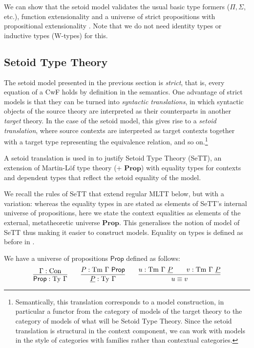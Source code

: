 \documentclass[autoref]{llncs}
\newcommand{\GG}{\Gamma}
\newcommand{\Prop}{\textsf{Prop}}
\newcommand{\mProp}{\mathbf{Prop}}
\newcommand{\Con}{\mathrm{Con}}
\newcommand{\Ty}{\mathrm{Ty}}
\newcommand{\Tm}{\mathrm{Tm}}
\begin{document}
We can show that the setoid model validates the usual basic type formers ($\Pi,
\Sigma$, etc.), function extensionality and a universe of strict
propositions with propositional extensionality \cite{setoid99}. Note that
we do not need identity types or inductive types (W-types) for this.

\subsection{Setoid Type Theory}\label{sett}

The setoid model presented in the previous section is \emph{strict}, that is,
every equation of a CwF holds by definition in the semantics. One advantage of
strict models is that they can be turned into \emph{syntactic translations}, in
which syntactic objects of the source theory are interpreted as their
counterparts in another \emph{target} theory. In the case of the setoid model,
this gives rise to a \emph{setoid translation}, where source contexts are
interpreted as target contexts together with a target type representing the
equivalence relation, and so on.\footnote{%
Semantically, this translation corresponds to a model construction, in
particular a functor from the category of models of the target theory to the
category of models of what will be Setoid Type Theory.  Since the setoid
translation is structural in the context component, we can work with models in
the style of categories with families rather than contextual categories.
}

A setoid translation is used in \cite{mpc19} to justify Setoid Type Theory
(SeTT), an extension of Martin-L\"of type theory (+ $\mProp$) with equality
types for contexts and dependent types that reflect the setoid equality of the
model.

We recall the rules of SeTT that extend regular MLTT below, but with a
variation: whereas the equality types in \cite{mpc19} are stated as elements of
SeTT's internal universe of propositions, here we state the context equalities
as elements of the external, metatheoretic universe $\mProp$. This generalises the
notion of model of SeTT thus making it easier to construct models. Equality on
types is defined as before in \cite{mpc19}.

We have a universe of propositions $\Prop$ defined as follows:
{\small\[
\infer{
  \Prop : \Ty\ \GG
}{
  \GG : \Con
}
\qquad
\infer{
  \underline{P} : \Ty\ \GG
}{
  P : \Tm\ \GG\ \Prop
}
\qquad
\infer{
  u \equiv v\vphantom{\Prop}
}{
  u : \Tm\ \GG\ \underline{P} && v : \Tm\ \GG\ \underline{P}
}
\]}\vspace{-1em}
\end{document}
